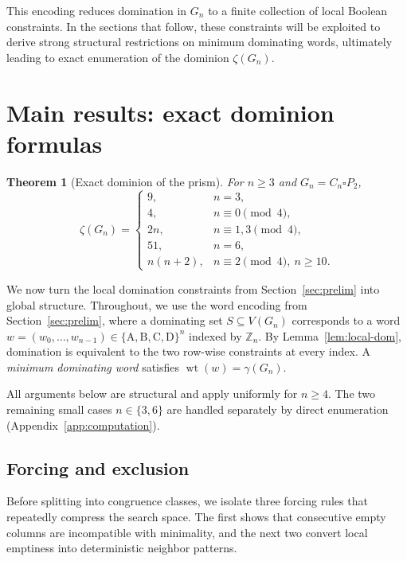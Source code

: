 \documentclass[11pt]{article}
\theoremstyle{plain}
\newtheorem{theorem}{Theorem}[section]
\theoremstyle{definition}
\theoremstyle{remark}
\newcommand{\ZZ}{\mathbb{Z}}
\DeclareMathOperator{\wt}{wt}
\newcommand{\colA}{\mathrm{A}}
\newcommand{\colB}{\mathrm{B}}
\newcommand{\colC}{\mathrm{C}}
\newcommand{\colD}{\mathrm{D}}
\begin{document}
This encoding reduces domination in $G_n$ to a finite collection of local Boolean constraints.
In the sections that follow, these constraints will be exploited to derive strong structural
restrictions on minimum dominating words, ultimately leading to exact enumeration of the
dominion $\zeta(G_n)$.

\section{Main results: exact dominion formulas}\label{sec:main}

\begin{theorem}[Exact dominion of the prism]\label{thm:main-dominion}
For $n\ge 3$ and $G_n=C_n\square P_2$,
\[
\zeta(G_n)=
\begin{cases}
9, & n=3,\\
4, & n\equiv 0\pmod{4},\\
2n, & n\equiv 1,3\pmod{4},\\
51, & n=6,\\
n(n+2), & n\equiv 2\pmod{4},\ n\ge 10.
\end{cases}
\]
\end{theorem}

\medskip
We now turn the local domination constraints from Section~\ref{sec:prelim} into global structure.
Throughout, we use the word encoding from Section~\ref{sec:prelim}, where a dominating set
$S\subseteq V(G_n)$ corresponds to a word
$w=(w_0,\dots,w_{n-1})\in\{\colA,\colB,\colC,\colD\}^n$ indexed by $\ZZ_n$.
By Lemma~\ref{lem:local-dom}, domination is equivalent to the two row-wise constraints at every
index.  A \emph{minimum dominating word} satisfies $\wt(w)=\gamma(G_n)$.

All arguments below are structural and apply uniformly for $n\ge4$.
The two remaining small cases $n\in\{3,6\}$ are handled separately by direct enumeration
(Appendix~\ref{app:computation}).
\subsection{Forcing and exclusion}\label{subsec:forcing}

Before splitting into congruence classes, we isolate three forcing rules that repeatedly
compress the search space.  The first shows that consecutive empty columns are incompatible
with minimality, and the next two convert local emptiness into deterministic neighbor patterns.
\end{document}
